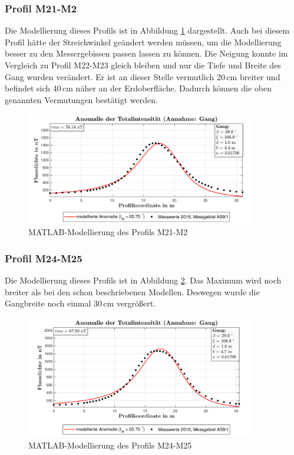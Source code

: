\subsubsection{Profil M21-M2}

Die Modellierung dieses Profils ist in Abbildung \ref{fig:modM21} dargestellt. Auch bei diesem Profil hätte der Streichwinkel geändert werden müssen, um die Modellierung besser zu den Messergebissen passen lassen zu können. Die Neigung konnte im Vergleich zu Profil M22-M23 gleich bleiben und nur die Tiefe und Breite des Gang wurden verändert. Er ist an dieser Stelle vermutlich 20\,cm breiter und befindet sich 40\,cm näher an der Erdoberfläche. Dadurch können die oben genannten Vermutungen bestätigt werden.

\begin{figure}
 \centering
 \includegraphics[width=0.9\textwidth]{fig/modM21}
 \caption{MATLAB-Modellierung des Profils M21-M2}
 \label{fig:modM21}
\end{figure}

\subsubsection{Profil M24-M25}

Die Modellierung dieses Profils ist in Abbildung \ref{fig:modM24}. Das Maximum wird noch breiter als bei den schon beschriebenen Modellen. Deswegen wurde die Gangbreite noch einmal 30\,cm vergrößert. 

\begin{figure}
 \centering
 \includegraphics[width=0.9\textwidth]{fig/modM24}
 \caption{MATLAB-Modellierung des Profils M24-M25}
 \label{fig:modM24}
\end{figure}



